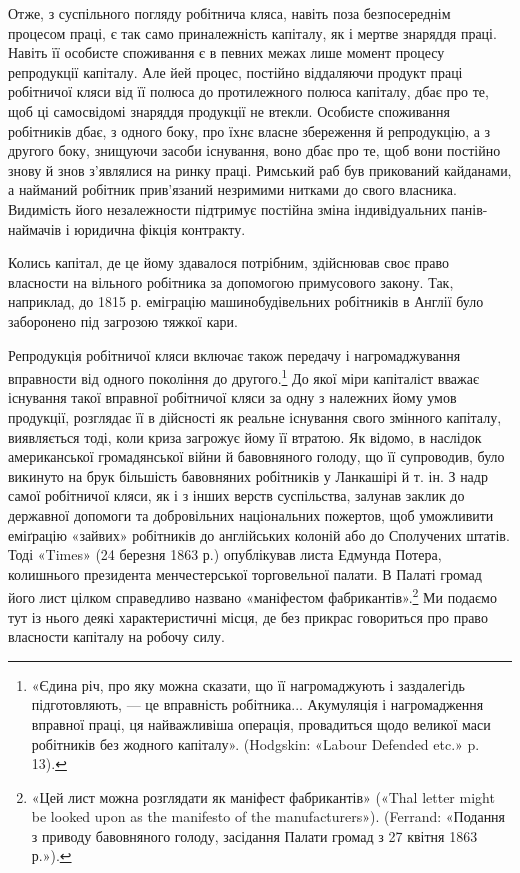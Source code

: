 Отже, з суспільного погляду робітнича кляса, навіть поза
безпосереднім процесом праці, є так само приналежність капіталу,
як і мертве знаряддя праці. Навіть її особисте споживання
є в певних межах лише момент процесу репродукції капіталу.
Але йей процес, постійно віддаляючи продукт праці робітничої
кляси від її полюса до протилежного полюса капіталу, дбає
про те, щоб ці самосвідомі знаряддя продукції не втекли. Особисте
споживання робітників дбає, з одного боку, про їхнє власне збереження
й репродукцію, а з другого боку, знищуючи засоби
існування, воно дбає про те, щоб вони постійно знову й знов
з’являлися на ринку праці. Римський раб був прикований
кайданами, а найманий робітник прив’язаний незримими нитками
до свого власника. Видимість його незалежности підтримує
постійна зміна індивідуальних панів-наймачів і юридична фікція
контракту.

Колись капітал, де це йому здавалося потрібним, здійснював
своє право власности на вільного робітника за допомогою примусового
закону. Так, наприклад, до 1815 р. еміграцію машинобудівельних
робітників в Англії було заборонено під загрозою
тяжкої кари.

Репродукція робітничої кляси включає також передачу і
нагромаджування вправности від одного покоління до другого.\footnote{
«Єдина річ, про яку можна сказати, що її нагромаджують і заздалегідь
підготовляють, — це вправність робітника... Акумуляція і нагромадження
вправної праці, ця найважливіша операція, провадиться щодо
великої маси робітників без жодного капіталу». (Hodgskin: «Labour
Defended etc.» p. 13).
}
До якої міри капіталіст вважає існування такої вправної
робітничої кляси за одну з належних йому умов продукції, розглядає
її в дійсності як реальне існування свого змінного капіталу,
виявляється тоді, коли криза загрожує йому її втратою.
Як відомо, в наслідок американської громадянської війни й
бавовняного голоду, що її супроводив, було викинуто на брук
більшість бавовняних робітників у Ланкашірі й т. ін. З надр
самої робітничої кляси, як і з інших верств суспільства, залунав
заклик до державної допомоги та добровільних національних
пожертов, щоб уможливити еміґрацію «зайвих» робітників до
англійських колоній або до Сполучених штатів. Тоді «Times»
(24 березня 1863 р.) опублікував листа Едмунда Потера, колишнього
президента менчестерської торговельної палати. В Палаті
громад його лист цілком справедливо названо «маніфестом
фабрикантів».\footnote{
«Цей лист можна розглядати як маніфест фабрикантів» («Thal
letter might be looked upon as the manifesto of the manufacturers»).
(Ferrand: «Подання з приводу бавовняного голоду, засідання Палати
громад з 27 квітня 1863 р.»).
} Ми подаємо тут із нього деякі характеристичні
місця, де без прикрас говориться про право власности капіталу
на робочу силу.

